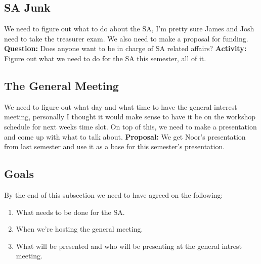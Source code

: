 \documentclass{article}
\begin{document}
\subsection{SA Junk}
We need to figure out what to do about the SA, I'm pretty sure James and Josh need to take the treasurer exam. We also need to make a proposal for funding. 
\vspace{2mm}\newline
\textbf{Question:} Does anyone want to be in charge of SA related affairs? 
\vspace{2mm}\newline
\textbf{Activity:} Figure out what we need to do for the SA this semester, all of it.

\subsection{The General Meeting}
We need to figure out what day and what time to have the general interest meeting, personally I thought it would make sense to have it be on the workshop schedule for next weeks time slot. On top of this, we need to make a presentation and come up with what to talk about.  
\vspace{2mm}\newline
\textbf{Proposal:} We get Noor's presentation from last semester and use it as a base for this semester's presentation. 


\subsection{Goals}
By the end of this subsection we need to have agreed on the following:
\begin{enumerate}
    \item What needs to be done for the SA.
    \item When we're hosting the general meeting.
    \item What will be presented and who will be presenting at the general intrest meeting.  
\end{enumerate}
\end{document}
